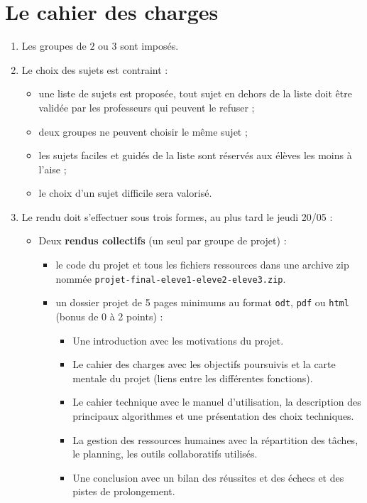 \documentclass[a4paper, french, 12pt]{article}  %
\newcounter{thme}
\newcounter{prop}
\newcounter{alg}
\begin{document}
\pagestyle{fancy}





\setlength{\parindent}{0cm}


\section{Le cahier des charges}


\begin{enumerate}

\item Les groupes de $2$ ou $3$ sont imposés.

\item Le choix des sujets est contraint : 
	\begin{itemize}
	\item une liste de sujets est proposée, tout sujet en dehors de la liste doit être validée par les professeurs qui peuvent le refuser ;
	\item  deux groupes ne peuvent choisir le même sujet ;
	\item  les sujets faciles et guidés de la liste sont réservés aux élèves les moins à l'aise ;
	\item le choix d'un sujet difficile sera valorisé.
	\end{itemize}
\item Le rendu doit s'effectuer sous trois formes, au plus tard le jeudi 20/05 :
\begin{itemize}
\item Deux \textbf{rendus collectifs} (un seul par groupe de projet) :
	\begin{itemize}
		\item {} le code du projet et tous les fichiers ressources dans une archive zip nommée \texttt{projet-final-eleve1-eleve2-eleve3.zip}.
		\item  {} un dossier projet de 5 pages minimums au format \texttt{odt}, \texttt{pdf} ou \texttt{html} (bonus de 0 à  2 points)  :
			\begin{itemize}
				\item Une introduction avec les motivations du projet.
				\item Le cahier des charges avec les objectifs poursuivis et la carte mentale du projet (liens entre les différentes fonctions).
				\item Le cahier technique avec le manuel d'utilisation, la description des principaux algorithmes et une présentation des choix techniques.
				\item La gestion des ressources humaines avec la répartition des tâches, le planning, les outils collaboratifs utilisés.
				\item Une conclusion avec un bilan des réussites et des échecs et des pistes de prolongement.
			

\end{itemize}
\end{itemize}
\end{itemize}
\end{enumerate}
\end{document}

